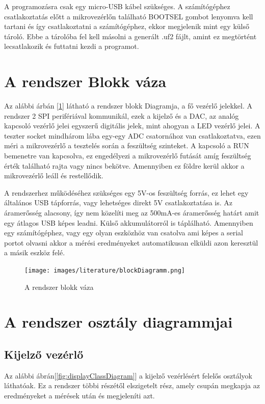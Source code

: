 A programozásra csak egy micro-USB kábel szükséges. A számítógéphez csatlakoztatás előtt
a mikrovezérlőn található BOOTSEL gombot lenyomva kell tartani és így csatlakoztatni a
számítógéphez, ekkor megjelenik mint egy külső tároló. Ebbe a tárolóba fel kell másolni
a generált .uf2 fájlt, amint ez megtörtént lecsatlakozik és futtatni kezdi a programot.

\section{A rendszer Blokk váza}

Az alábbi árbán [\ref{fig:blockDiagramm}] látható a rendszer blokk Diagramja, a fő vezérlő jelekkel.
A rendszer 2 SPI perifériával kommunikál, ezek a kijelző és a DAC, az analóg kapcsoló vezérlő jelei 
egyszerű digitális jelek, mint ahogyan a LED vezérlő jelei. A teszter socket mindhárom lába egy-egy ADC
csatornához van csatlakoztatva, ezen méri a mikrovezérlő a tesztelés során a feszültség szinteket.
A kapcsoló a RUN bemenetre van kapcsolva, ez engedélyezi a mikrovezérlő futását amíg feszültség érték 
található rajta vagy nincs bekötve. Amennyiben ez földre kerül akkor a mikrovezérlő leáll és restellődik.

A rendszerhez működéséhez szükséges egy 5V-os feszültség forrás, ez lehet egy általános USB
tápforrás, vagy lehetséges direkt 5V csatlakoztatása is. Az áramerősség alacsony, így nem közelíti
meg az 500mA-es áramerősség határt amit egy átlagos USB képes leadni. Külső akkumulátorról
is táplálható. Amennyiben egy számítógéphez, vagy egy olyan eszközhöz van csatolva ami képes 
a serial portot olvasni akkor a mérési eredményeket automatikusan elküldi azon keresztül a 
másik eszköz felé. 


\begin{figure}[h]
    \centering
    \texttt{[image: images/literature/blockDiagramm.png]}
    \caption{A rendszer blokk váza}
    \label{fig:blockDiagramm}
\end{figure}

\section{A rendszer osztály diagrammjai}

\subsection{Kijelző vezérlő}

Az alábbi ábrán[\ref{fig:displayClassDiagram}] a kijelző vezérlésért felelős osztályok láthatóak.
Ez a rendszer többi részétől elszigetelt rész, amely csupán 
megkapja az eredményeket a mérések után és megjeleníti azt.



